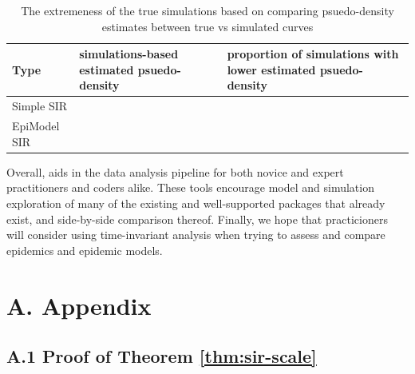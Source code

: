 \documentclass[
  shortnames]{jss}
\begin{document}
\begin{CodeChunk}
\begin{table}[!h]

\caption{\label{tab:hags-extreme}The extremeness of the true simulations based on comparing psuedo-density estimates between true vs simulated curves}
\centering
\begin{tabular}[t]{l>{\raggedleft\arraybackslash}p{6cm}>{\raggedleft\arraybackslash}p{6cm}}
\toprule
Type & simulations-based estimated psuedo-density & proportion of simulations with lower estimated psuedo-density\\
\midrule
Simple SIR & 0.0117621 & 0.01\\
EpiModel SIR & 0.0356503 & 0.01\\
\bottomrule
\end{tabular}
\end{table}

\end{CodeChunk}

Overall,  aids in the data analysis pipeline for both
novice and expert practitioners and coders alike. These tools encourage
model and simulation exploration of many of the existing and
well-supported packages that already exist, and side-by-side comparison
thereof. Finally, we hope that practicioners will consider using
time-invariant analysis when trying to assess and compare epidemics and
epidemic models.

\hypertarget{a.-appendix}{%
\section*{A. Appendix}\label{a.-appendix}}

\hypertarget{a.1-proof-of-theorem}{%
\subsection*{\texorpdfstring{A.1 Proof of Theorem
\ref{thm:sir-scale}}{A.1 Proof of Theorem }}\label{a.1-proof-of-theorem}}
\end{document}
